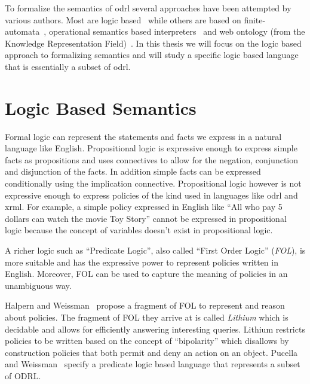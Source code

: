 To formalize the semantics of \ac{odrl} several approaches have been attempted by various authors. Most are logic based~\cite{Halpern2008, pucella2006} while others are based on finite-automata~\cite{Holzer}, operational semantics based interpreters~\cite{Safavi-naini} and web ontology (from the Knowledge Representation Field)~\cite{Kasten2010MTS}. In this thesis we will focus on the logic based approach to formalizing semantics and will study a specific logic based language that is essentially a subset of \ac{odrl}.



\section{Logic Based Semantics}


Formal logic can represent the statements and facts we express in a natural language like English. Propositional logic is expressive enough to express simple facts as propositions and uses connectives to allow for the negation, conjunction and disjunction of the facts. In addition simple facts can be expressed conditionally using the implication connective. Propositional logic however is not expressive enough to express policies of the kind used in languages like \ac{odrl} and \ac{xrml}. For example, a simple policy expressed in English like ``All who pay 5 dollars can watch the movie Toy Story'' cannot be expressed in propositional logic because the concept of  variables doesn't exist in propositional logic. 

A richer logic such as ``Predicate Logic'', also called ``First Order Logic'' (\emph{FOL}), is more suitable and has the expressive power to represent policies written in English. Moreover, FOL can be used to capture the meaning of policies in an unambiguous way.

Halpern and Weissman~\cite{Halpern2008} propose a fragment of FOL to represent and reason about policies. The fragment of FOL they arrive at is called \emph{Lithium} which is decidable and allows for efficiently answering interesting queries. Lithium restricts policies to be written based on the concept of ``bipolarity'' which disallows by construction policies that both permit and deny an action on an object. Pucella and Weissman~\cite{pucella2006} specify a predicate logic based language that represents a subset of ODRL.


